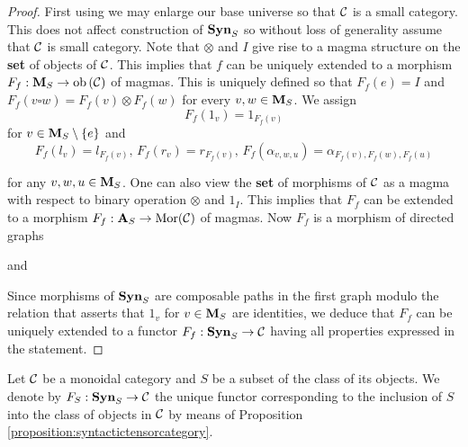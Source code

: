 \begin{proof}
First using {\cite[Introduction]{Presheaves}} we may enlarge our base universe so that ${\mathcal C}$ is a small category. This does not affect construction of $\mathbf{Syn}_S$ so without loss of generality assume that ${\mathcal C}$ is small category. Note that $\otimes$ and $I$ give rise to a magma structure on the \textbf{set} of objects of ${\mathcal C}$. This implies that $f$ can be uniquely extended to a morphism $F_f:\mathbf{M}_S\rightarrow \mathrm{ob}\left({\mathcal C}\right)$ of magmas. This is uniquely defined so that $F_f(e) = I$ and $F_f(v\square w) = F_f(v)\otimes F_f(w)$ for every $v, w\in \mathbf{M}_S$. We assign
$$F_f(1_v)= 1_{F_f(v)}$$
for $v\in \mathbf{M}_S\setminus \{e\}$ and
$$F_f(l_v) = l_{F_f(v)},\,F_f(r_v) = r_{F_f(v)},\,F_f(\alpha_{v,w,u}) = \alpha_{F_f(v),F_f(w),F_f(u)}$$

for any $v,w,u\in \mathbf{M}_S$. One can also view the \textbf{set} of morphisms of ${\mathcal C}$ as a magma with respect to binary operation $\otimes$ and $1_I$. This implies that $F_f$ can be extended to a morphism $F_f:\mathbf{A}_S\rightarrow \mathrm{Mor}({\mathcal C})$ of magmas. Now $F_f$ is a morphism of directed graphs
\begin{center}
\end{center}
and
\begin{center}
\end{center}
Since morphisms of $\mathbf{Syn}_S$ are composable paths in the first graph modulo the relation that asserts that $1_v$ for $v\in \mathbf{M}_S$ are identities, we deduce that $F_f$ can be uniquely extended to a functor $F_f:\mathbf{Syn}_S\rightarrow {\mathcal C}$ having all properties expressed in the statement.
\end{proof}
\noindent
Let ${\mathcal C}$ be a monoidal category and $S$ be a subset of the class of its objects. We denote by $F_S:\mathbf{Syn}_S\rightarrow {\mathcal C}$ the unique functor corresponding to the inclusion of $S$ into the class of objects in ${\mathcal C}$ by means of Proposition \ref{proposition:syntactictensorcategory}.


